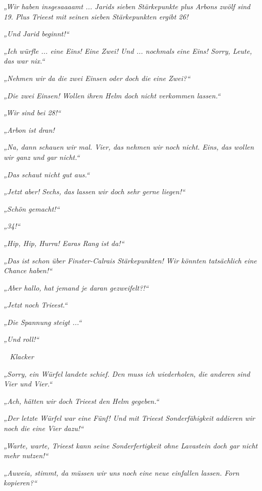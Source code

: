 \trennzeichen



\textit{„Wir haben insgesaaaamt ... Jarids sieben Stärkepunkte plus Arbons zwölf sind 19. Plus Trieest mit seinen sieben Stärkepunkten ergibt 26!}

\textit{„Und Jarid beginnt!“}

\textit{„Ich würfle ... eine Eins! Eine Zwei! Und ... nochmals eine Eins! Sorry, Leute, das war nix.“}

\textit{„Nehmen wir da die zwei Einsen oder doch die eine Zwei?“}

\textit{„Die zwei Einsen! Wollen ihren Helm doch nicht verkommen lassen.“}

\textit{„Wir sind bei 28!“}

\textit{„Arbon ist dran!}

\textit{„Na, dann schauen wir mal. Vier, das nehmen wir noch nicht. Eins, das wollen wir ganz und gar nicht.“}

\textit{„Das schaut nicht gut aus.“}

\textit{„Jetzt aber! Sechs, das lassen wir doch sehr gerne liegen!“}

\textit{„Schön gemacht!“}

\textit{„34!“}

\textit{„Hip, Hip, Hurra! Earas Rang ist da!“}

\textit{„Das ist schon über Finster-Calrais Stärkepunkten! Wir könnten tatsächlich eine Chance haben!“}

\textit{„Aber hallo, hat jemand je daran gezweifelt?!“}

\textit{„Jetzt noch Trieest.“}

\textit{„Die Spannung steigt ...“}

\textit{„Und roll!“}

\textit{~ Klacker ~}

\textit{„Sorry, ein Würfel landete schief. Den muss ich wiederholen, die anderen sind Vier und Vier.“}

\textit{„Ach, hätten wir doch Trieest den Helm gegeben.“}

\textit{„Der letzte Würfel war eine Fünf! Und mit Trieest Sonderfähigkeit addieren wir noch die eine Vier dazu!“}

\textit{„Warte, warte, Trieest kann seine Sonderfertigkeit ohne Lavastein doch gar nicht mehr nutzen!“}

\textit{„Auweia, stimmt, da müssen wir uns noch eine neue einfallen lassen. Forn kopieren?“}

